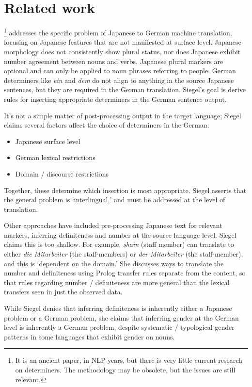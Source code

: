 \documentclass[11pt]{article}
\begin{document}
\section{Related work}

\citet{siegel:1996}\footnote{It is an ancient paper, in NLP-years, but there is very little current research on determiners. The methodology may be obsolete, but the issues are still relevant.} addresses the specific problem of Japanese to German machine translation, focusing on Japanese features that are not manifested at surface level. Japanese morphology does not consistently show plural status, nor does Japanese exhibit number agreement between nouns and verbs. Japanese plural markers are optional and can only be applied to noun phrases referring to people.
German determiners like \emph{ein} and \emph{dem} do not align to anything in the source Japanese sentences, but they are required in the German translation. Siegel's goal is derive rules for inserting appropriate determiners in the German sentence output.

It's not a simple matter of post-processing output in the target language; Siegel claims several factors affect the choice of determiners in the German:
\begin{itemize}[itemsep=0pt,topsep=6pt]
  \item Japanese surface level
  \item German lexical restrictions
  \item Domain / discourse restrictions
\end{itemize}
Together, these determine which insertion is most appropriate. Siegel asserts that the general problem is `interlingual,' and must be addressed at the level of translation.

Other approaches have included pre-processing Japanese text for relevant markers, inferring definiteness and number at the source language level.
Siegel claims this is too shallow. For example, \emph{shain} (staff member) can translate to either \emph{die Mitarbeiter} (the staff-members) or \emph{der Mitarbeiter} (the staff-member), and this is `dependent on the domain.'
She discusses ways to translate the number and definiteness using Prolog transfer rules separate from the content, so that rules regarding number / definiteness are more general than the lexical transfers seen in just the observed data.

While Siegel denies that inferring definiteness is inherently either a Japanese problem or a German problem, she claims that inferring gender at the German level is inherently a German problem, despite systematic / typological gender patterns in some languages that exhibit gender on nouns.
\end{document}
